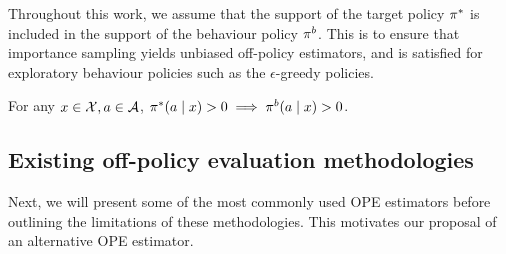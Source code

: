 

Throughout this work, we assume that the support of the target policy $\pi^*$ is included in the support of the behaviour policy $\pi^b$. This is to ensure that importance sampling yields unbiased off-policy estimators, and is satisfied for exploratory behaviour policies such as the $\epsilon$-greedy policies. 
\begin{assumption}[Support]
    For any $x \in \mathcal{X}, a \in \mathcal{A}$,  $\pi^*(a\mid x) >0 \implies \pi^b(a\mid x) >0$. 
\end{assumption}
 

\subsection{Existing off-policy evaluation methodologies}
Next, we will present some of the most commonly used OPE estimators before outlining the limitations of these methodologies. This motivates our proposal of an alternative OPE estimator. 

